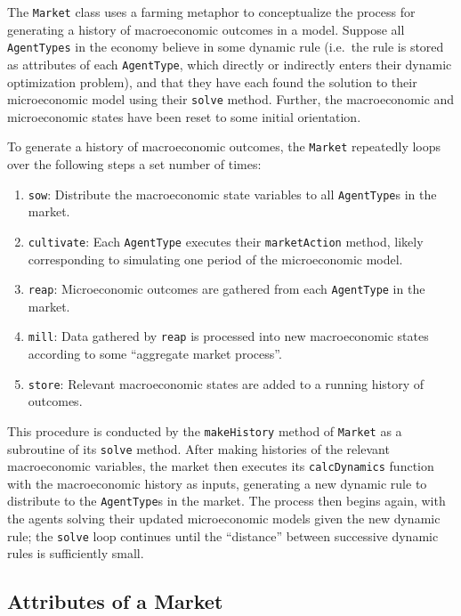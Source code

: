 \documentclass[12pt,titlepage,letterpaper]{econtex}
\begin{document}
{The \texttt{Market} class uses a farming metaphor to conceptualize the process for generating a history of macroeconomic outcomes in a model.  Suppose all \texttt{AgentTypes} in the economy believe in some dynamic rule (i.e.\ the rule is stored as attributes of each \texttt{AgentType}, which directly or indirectly enters their dynamic optimization problem), and that they have each found the solution to their microeconomic model using their \texttt{solve} method.  Further, the macroeconomic and microeconomic states have been reset to some initial orientation.

To generate a history of macroeconomic outcomes, the \texttt{Market} repeatedly loops over the following steps a set number of times:
\begin{enumerate}
\item \texttt{sow}: Distribute the macroeconomic state variables to all \texttt{AgentType}s in the market.

\item \texttt{cultivate}: Each \texttt{AgentType} executes their \texttt{marketAction} method, likely corresponding to simulating one period of the microeconomic model.

\item \texttt{reap}: Microeconomic outcomes are gathered from each \texttt{AgentType} in the market.

\item \texttt{mill}: Data gathered by \texttt{reap} is processed into new macroeconomic states according to some ``aggregate market process''.

\item \texttt{store}: Relevant macroeconomic states are added to a running history of outcomes.
\end{enumerate}
This procedure is conducted by the \texttt{makeHistory} method of \texttt{Market} as a subroutine of its \texttt{solve} method.  After making histories of the relevant macroeconomic variables, the market then executes its \texttt{calcDynamics} function with the macroeconomic history as inputs, generating a new dynamic rule to distribute to the \texttt{AgentType}s in the market.  The process then begins again, with the agents solving their updated microeconomic models given the new dynamic rule; the \texttt{solve} loop continues until the ``distance'' between successive dynamic rules is sufficiently small.

\subsection{Attributes of a Market}\label{sec:AttributesOfAMarket}

}
\end{document}

